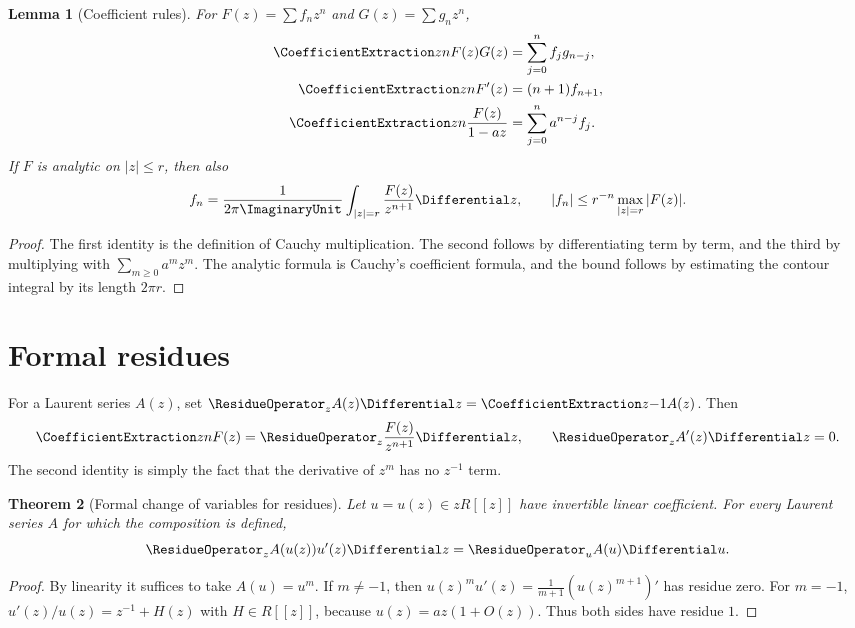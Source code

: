 \documentclass[11pt,a4paper,oneside,openany]{book}
\newtheorem{theorem}{Theorem}[chapter]
\newtheorem{lemma}[theorem]{Lemma}
\theoremstyle{definition}
\theoremstyle{remark}
\begin{document}
\begin{lemma}[Coefficient rules]\label{lem:coeff-rules}
For $F(z)=\sum f_nz^n$ and $G(z)=\sum g_nz^n$,
\begin{align}
 \CoefficientExtraction z n F(z)G(z)&=\sum_{j=0}^n f_jg_{n-j},\label{eq:cauchy}\\
 \CoefficientExtraction z n F'(z)&=(n+1)f_{n+1},\label{eq:der-coeff}\\
 \CoefficientExtraction z n \frac{F(z)}{1-az}&=\sum_{j=0}^n a^{n-j}f_j.\label{eq:geom-conv}
\end{align}
If $F$ is analytic on $|z|\le r$, then also
\begin{equation}\label{eq:cauchy-coeff}
 f_n=\frac{1}{2\pi \ImaginaryUnit}\int_{|z|=r}\frac{F(z)}{z^{n+1}}\Differential z,
 \qquad |f_n|\le r^{-n}\max_{|z|=r}|F(z)|.
\end{equation}
\end{lemma}
\begin{proof}
The first identity is the definition of Cauchy multiplication.  The second follows
by differentiating term by term, and the third by multiplying with
$\sum_{m\ge0}a^mz^m$.  The analytic formula is Cauchy's coefficient formula, and the
bound follows by estimating the contour integral by its length $2\pi r$.
\end{proof}

\section{Formal residues}
For a Laurent series $A(z)$, set
$\ResidueOperator_z A(z)\Differential z=\CoefficientExtraction z{-1}A(z)$.  Then
\begin{equation}\label{eq:res-coeff}
 \CoefficientExtraction z n F(z)=\ResidueOperator_z\frac{F(z)}{z^{n+1}}\Differential z,
 \qquad \ResidueOperator_z A'(z)\Differential z=0.
\end{equation}
The second identity is simply the fact that the derivative of $z^m$ has no
$z^{-1}$ term.

\begin{theorem}[Formal change of variables for residues]\label{thm:res-subst}
Let $u=u(z)\in zR[[z]]$ have invertible linear coefficient.  For every Laurent series
$A$ for which the composition is defined,
\begin{equation}\label{eq:formal-res-subst}
 \ResidueOperator_z A(u(z))u'(z)\Differential z=\ResidueOperator_u A(u)\Differential u.
\end{equation}
\end{theorem}
\begin{proof}
By linearity it suffices to take $A(u)=u^m$.  If $m\ne-1$, then
$u(z)^mu'(z)=\frac{1}{m+1}(u(z)^{m+1})'$ has residue zero.  For $m=-1$,
$u'(z)/u(z)=z^{-1}+H(z)$ with $H\in R[[z]]$, because
$u(z)=az(1+O(z))$.  Thus both sides have residue $1$.
\end{proof}
\end{document}
